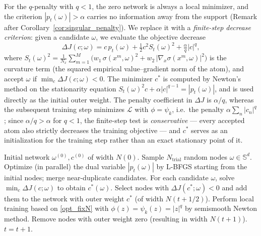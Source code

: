 \documentclass[11pt]{amsart}
\theoremstyle{definition}
\theoremstyle{remark}
\begin{document}
For the $q$-penalty with $q < 1$, the zero network is always a local minimizer, and the criterion $|p_t(\omega)| > \alpha$ carries no information away from the support (Remark after Corollary~\ref{cor:singular_penalty}).
We replace it with a \emph{finite-step decrease criterion}:
given a candidate $\omega$, we evaluate the objective decrease
\begin{equation*}
	\Delta J(c; \omega) = c \, p_t(\omega) + \tfrac{1}{2} c^2 S_t(\omega)^2 + \tfrac{\alpha}{q} |c|^q,
\end{equation*}
where $S_t(\omega)^2 = \frac{1}{N_x}\sum_{m=1}^M \big( w_1\, \sigma(x^m, \omega)^2 + w_2\, |\nabla_x \sigma(x^m, \omega)|^2 \big)$ is the curvature term (the squared empirical value--gradient norm of the atom),
and accept $\omega$ if $\min_c \Delta J(c; \omega) < 0$.
The minimizer $c^*$ is computed by Newton's method on the stationarity equation
$S_t(\omega)^2 c + \alpha |c|^{q-1} = |p_t(\omega)|$,
and is used directly as the initial outer weight.
The penalty coefficient in $\Delta J$ is $\alpha/q$, whereas the subsequent training step minimizes $\mathcal{L}$ with $\phi = \psi_k$, i.e.\ the penalty $\alpha \sum_n |c_n|^q$; since $\alpha/q > \alpha$ for $q < 1$, the finite-step test is \emph{conservative} --- every accepted atom also strictly decreases the training objective --- and $c^*$ serves as an initialization for the training step rather than an exact stationary point of it.

\begin{algorithm}[htbp]
\caption{Iterative node insertion and optimization with $|c|^q$-penalty}
\label{alg:q}
\begin{algorithmic}[1]
\State Initial network $\omega^{(0)}, c^{(0)}$ of width $N(0)$.
\State Sample $N_{\mathrm{trial}}$ random nodes $\omega \in \mathbb{S}^d$.
\State Optimize (in parallel) the dual variable $|p_t(\omega)|$ by L-BFGS starting from the initial nodes; merge near-duplicate candidates.
\State For each candidate $\omega$, solve $\min_c \Delta J(c; \omega)$ to obtain $c^*(\omega)$. Select nodes with $\Delta J(c^*; \omega) < 0$ and add them to the network with outer weight $c^*$ (of width $N(t + 1/2)$).
\State Perform local training based on \eqref{opt_fixN} with $\phi(z) = \psi_k(z) = |z|^q$ by semismooth Newton method.
\State Remove nodes with outer weight zero (resulting in width $N(t+1)$).
\State $t = t + 1$.
\EndWhile
\end{algorithmic}
\end{algorithm}
\end{document}
